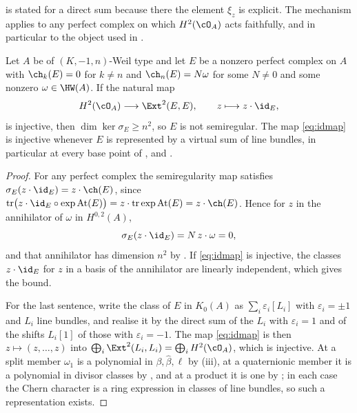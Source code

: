  is stated for a direct sum because there the element
$\xi_{z}$ is explicit. The mechanism applies to any perfect complex on which
$H^{2}(\cO_{A})$ acts faithfully, and in particular to the object used in
.

\begin{proposition}
\label{prop:concentrated}
Let $A$ be of $(K,-1,n)$-Weil type and let $E$ be a nonzero perfect complex on
$A$ with $\ch_{k}(E)=0$ for $k\ne n$ and $\ch_{n}(E)=N\omega$ for some
$N\ne0$ and some nonzero $\omega\in\HW(A)$. If the natural map
\begin{equation}\label{eq:idmap}
  H^{2}(\cO_{A})\longrightarrow\Ext^{2}(E,E),\qquad z\longmapsto z\cdot\id_{E},
\end{equation}
is injective, then $\dim\ker\sigma_{E}\ge n^{2}$, so $E$ is not semiregular.
The map \eqref{eq:idmap} is injective whenever $E$ is represented by a virtual
sum of line bundles, in particular at every base point of
,  and .
\end{proposition}

\begin{proof}
For any perfect complex the semiregularity map satisfies
$\sigma_{E}(z\cdot\id_{E})=z\cdot\ch(E)$, since
$\operatorname{tr}\bigl(z\cdot\id_{E}\circ\exp\mathrm{At}(E)\bigr)
=z\cdot\operatorname{tr}\exp\mathrm{At}(E)=z\cdot\ch(E)$. Hence for $z$ in the
annihilator of $\omega$ in $H^{0,2}(A)$,
\[
  \sigma_{E}(z\cdot\id_{E})=N\,z\cdot\omega=0 ,
\]
and that annihilator has dimension $n^{2}$ by . If
\eqref{eq:idmap} is injective, the classes $z\cdot\id_{E}$ for $z$ in a basis
of the annihilator are linearly independent, which gives the bound.

For the last sentence, write the class of $E$ in $K_{0}(A)$ as
$\sum_{i}\varepsilon_{i}[L_{i}]$ with $\varepsilon_{i}=\pm1$ and $L_{i}$ line
bundles, and realise it by the direct sum of the $L_{i}$ with
$\varepsilon_{i}=1$ and of the shifts $L_{i}[1]$ of those with
$\varepsilon_{i}=-1$. The map \eqref{eq:idmap} is then $z\mapsto(z,\dots,z)$
into $\bigoplus_{i}\Ext^{2}(L_{i},L_{i})=\bigoplus_{i}H^{2}(\cO_{A})$, which is
injective. At a split member $\omega_{1}$ is a polynomial in
$\beta,\widehat\beta,\ell$ by (iii), at a quaternionic
member it is a polynomial in divisor classes by , and at a
product it is one by ; in each case the Chern character is a
ring expression in classes of line bundles, so such a representation exists.
\end{proof}

